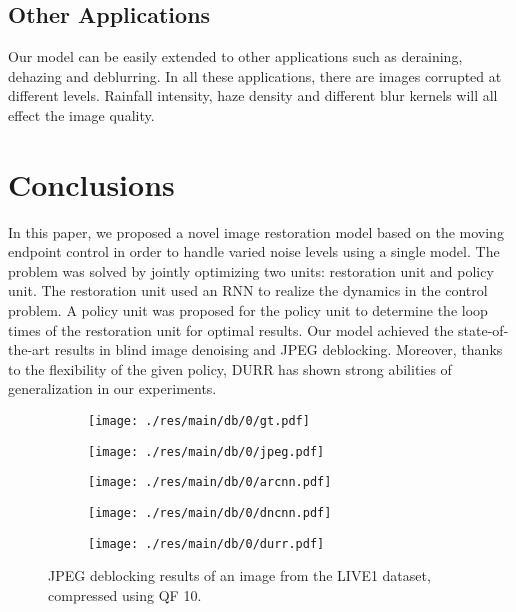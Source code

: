 \documentclass{article} %
\begin{document}
\subsection{Other Applications}

Our model can be easily extended to other applications such as
deraining, dehazing and deblurring. In all these applications,
there are images corrupted at different levels. Rainfall intensity,
haze density and different blur kernels will all effect
the image quality.


\section{Conclusions}

In this paper, we proposed a novel image restoration model based on
the moving endpoint control in order to handle varied noise levels using a single model. The problem was solved by
jointly optimizing two units: restoration unit and policy unit.
The restoration unit used an RNN to realize the dynamics
in the control problem. A policy unit was proposed for
the policy unit to determine the loop times of the restoration unit
for optimal results. Our model achieved the state-of-the-art
results in blind image denoising and JPEG deblocking. Moreover,
thanks to the flexibility of the given policy, DURR has shown
strong abilities of generalization in our experiments.



\begin{figure}[htp!]
	\centering
	\begin{subfigure}[t]{0.195\textwidth}
		\centering
		\texttt{[image: ./res/main/db/0/gt.pdf]}
	\end{subfigure}
	\begin{subfigure}[t]{0.195\textwidth}
		\centering
		\texttt{[image: ./res/main/db/0/jpeg.pdf]}
	\end{subfigure}
	\begin{subfigure}[t]{0.195\textwidth}
		\centering
		\texttt{[image: ./res/main/db/0/arcnn.pdf]}
	\end{subfigure}
	\begin{subfigure}[t]{0.195\textwidth}
		\centering
		\texttt{[image: ./res/main/db/0/dncnn.pdf]}
	\end{subfigure}
	\begin{subfigure}[t]{0.195\textwidth}
		\centering
		\texttt{[image: ./res/main/db/0/durr.pdf]}
	\end{subfigure}
	\caption{JPEG deblocking results of an image from the LIVE1 dataset,
		compressed using QF 10.}
	\label{jpegres2}
\end{figure}
\end{document}

